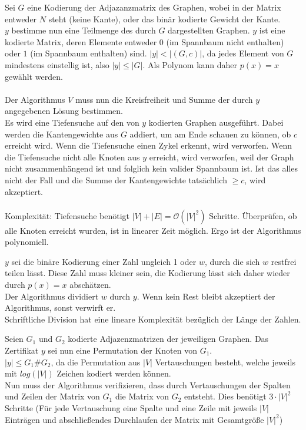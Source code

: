 Sei $G$ eine Kodierung der Adjazanzmatrix des Graphen, wobei in der Matrix entweder $N$ steht (keine Kante), oder das binär kodierte Gewicht der Kante.\\
$y$ bestimme nun eine Teilmenge des durch $G$ dargestellten Graphen. $y$ ist eine kodierte Matrix, deren Elemente entweder $0$ (im Spannbaum nicht enthalten) oder $1$ (im Spannbaum enthalten) sind. $|y| < |(G, c)|$, da jedes Element von $G$ mindestens einstellig ist, also $|y| \leq |G|$. Als Polynom kann daher $p(x)=x$ gewählt werden.\\ \ \\
Der Algorithmus $V$ muss nun die Kreisfreiheit und Summe der durch $y$ angegebenen Lösung bestimmen.\\
Es wird eine Tiefensuche auf den von $y$ kodierten Graphen ausgeführt. Dabei werden die Kantengewichte aus $G$ addiert, um am Ende schauen zu können, ob $c$ erreicht wird. Wenn die Tiefensuche einen Zykel erkennt, wird verworfen. Wenn die Tiefensuche nicht alle Knoten aus $y$ erreicht, wird verworfen, weil der Graph nicht zusammenhängend ist und folglich kein valider Spannbaum ist. Ist das alles nicht der Fall und die Summe der Kantengewichte tatsächlich $\geq c$, wird akzeptiert.\\ \ \\
Komplexität: Tiefensuche benötigt $|V|+|E|=\mathcal{O}(|V|^2)$ Schritte. Überprüfen, ob alle Knoten erreicht wurden, ist in linearer Zeit möglich. Ergo ist der Algorithmus polynomiell.

$y$ sei die binäre Kodierung einer Zahl ungleich 1 oder $w$, durch die sich $w$ restfrei teilen lässt. Diese Zahl muss kleiner sein, die Kodierung lässt sich daher wieder durch $p(x)=x$ abschätzen.\\
Der Algorithmus dividiert $w$ durch $y$. Wenn kein Rest bleibt akzeptiert der Algorithmus, sonst verwirft er.\\
Schriftliche Division hat eine lineare Komplexität bezüglich der Länge der Zahlen.

Seien $G_1$ und $G_2$ kodierte Adjazenzmatrizen der jeweiligen Graphen. Das Zertifikat $y$ sei nun eine Permutation der Knoten von $G_1$.\\
$|y| \leq G_1\#G_2$, da die Permutation aus $|V|$ Vertauschungen besteht, welche jeweils mit $log(|V|)$ Zeichen kodiert werden können.\\
Nun muss der Algorithmus verifizieren, dass durch Vertauschungen der Spalten und Zeilen der Matrix von $G_1$ die Matrix von $G_2$ entsteht. Dies benötigt $3\cdot|V|^2$ Schritte (Für jede Vertauschung eine Spalte und eine Zeile mit jeweils $|V|$ Einträgen und abschließendes Durchlaufen der Matrix mit Gesamtgröße $|V|^2$)